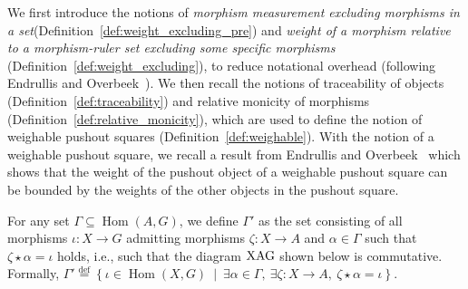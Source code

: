 
We first introduce the notions of \emph{morphism measurement excluding morphisms in a set}(Definition~\ref{def:weight_excluding_pre}) and \emph{weight of a morphism relative to a morphism-ruler set excluding some specific morphisms} (Definition~\ref{def:weight_excluding}),
to reduce notational overhead (following Endrullis and Overbeek~\cite{endrullis2024generalized_icgt}).
We then recall the notions of traceability of objects (Definition~\ref{def:traceability}) and relative monicity of morphisms (Definition~\ref{def:relative_monicity}),
which are used to define the notion of weighable pushout squares (Definition~\ref{def:weighable}). With the notion of a weighable pushout square, we recall a result from Endrullis and Overbeek~\cite{endrullis2024generalized_icgt} which shows that the weight of the pushout object of a weighable pushout square can be bounded by the weights of the other objects in the pushout square.

For any set \( \Gamma \mathop{\subseteq} \operatorname{Hom}(A, G) \),
    we define $\Gamma'$ as the set consisting of all morphisms \( \iota : X \mathop{\to} G \) admitting morphisms \( \zeta \mathop{\colon} X \mathop{\to} A \) and \( \alpha \mathop{\in} \Gamma \) such that $\zeta \mathop{\star} \alpha \mathop{=} \iota$ holds, i.e., such that
     the diagram $\operatorname{XAG}$ shown below
     is commutative.  Formally,  
    \(
    \Gamma' \overset{\operatorname{def}}{=} \left\{ \iota \mathop{\in} \operatorname{Hom}(X, G)~\middle|~\exists \alpha \mathop{\in} \Gamma,~\exists \zeta:X \mathop{\to} A,~\zeta \mathop{\star} \alpha \mathop{=} \iota \right\}. 
    \)

